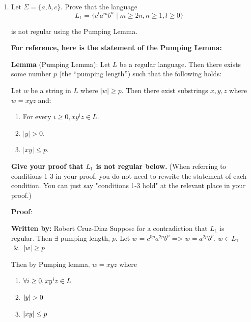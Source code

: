 \documentclass{article}
\theoremstyle{definition}
\newenvironment {solution}
{
\begin{tcolorbox}
}
{
\end{tcolorbox}
}
\begin{document}
\begin{enumerate}
          \pagebreak

    \item  Let $\Sigma = \{a,b,c\}$. Prove that the language
          \[
              L_1 = \{c^la^mb^{n} \mid m \geq 2n, n \geq 1, l\geq 0\}
          \]

          is not regular using the Pumping Lemma.


          \textbf{For reference, here is the statement of the Pumping Lemma:}


          \textbf{Lemma} (Pumping Lemma):
          Let $L$ be a regular language. Then there exists some number $p$ (the ``pumping length'') such that the following holds:

          Let $w$ be a string in $L$ where $|w| \geq p$. Then there exist substrings $x, y, z$ where $w = xyz$ and:
          \begin{enumerate}
              \item For every $i \geq 0, xy^iz \in L$.
              \item $|y| > 0$.
              \item $|xy| \leq p$.
          \end{enumerate}

          \textbf{Give your proof that $L_1$ is not regular below.}
          (When referring to conditions 1-3 in your proof, you do not need to rewrite the statement of each condition. You can just say "conditions 1-3 hold" at the relevant place in your proof.)

          \textbf{Proof}:

          \begin{solution}
              \textbf{Written by:} Robert Cruz-Diaz \newline
              \newline
              Suppose for a contradiction that $L_1$ is regular. \newline
              Then $\exists$ pumping length, $p$.\newline
              Let $w$ = $c^{0p} a^{2p} b^{p}$ => $w = a^{2p} b^{p}$. $w\in L_1$ $\And$ $|w| \geq p$

              Then by Pumping lemma, $w = xyz$ where
              \begin{enumerate}[label=(\arabic*)]
                  \item $\forall i \space \geq 0, \space xy^iz \space \in \space L$
                  \item $|y| \space > 0$
                  \item $|xy| \space \leq p$
              \end{enumerate}


\end{solution}
\end{enumerate}
\end{document}
